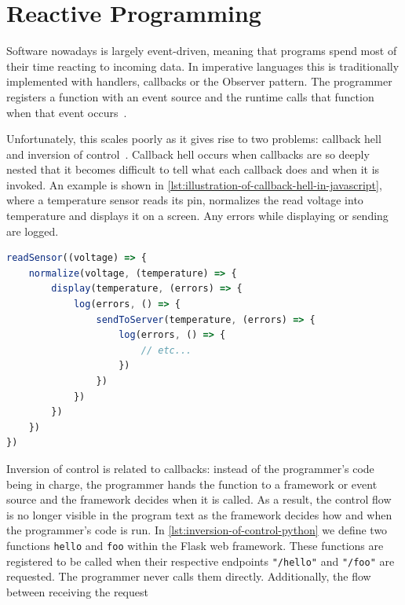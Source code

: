 \documentclass[a4paper]{book}
\begin{document}
\section{Reactive Programming}
\label{sec:reactive-programming}
Software nowadays is largely event-driven, meaning that programs spend most of
their time reacting to incoming data. In imperative languages this is
traditionally implemented with handlers, callbacks or the Observer pattern. The
programmer registers a function with an event source and the runtime calls that
function when that event occurs~\cite{surveyRP2024}.
\par
Unfortunately, this scales poorly as it gives rise to two problems: callback
hell and inversion of control~\cite{surveyRP2024}. Callback hell occurs when
callbacks are so deeply nested that it becomes difficult to tell what each
callback does and when it is invoked. An example is shown in
\cref{lst:illustration-of-callback-hell-in-javascript}, where a temperature
sensor reads its pin, normalizes the read voltage into temperature and displays
it on a screen. Any errors while displaying or sending are logged.
\begin{listing}[ht]
    \centering
	\begin{lstlisting}[language=JavaScript]
readSensor((voltage) => {
    normalize(voltage, (temperature) => {
        display(temperature, (errors) => {
            log(errors, () => {
                sendToServer(temperature, (errors) => {
                    log(errors, () => {
                        // etc...
                    })
                })
            })
        })
    })
})\end{lstlisting}
	\caption{Illustration of callback hell in JavaScript}
	\label{lst:illustration-of-callback-hell-in-javascript}
\end{listing}
\par
Inversion of control is related to callbacks: instead of the programmer's code
being in charge, the programmer hands the function to a framework or event
source and the framework decides when it is called. As a result, the control
flow is no longer visible in the program text as the framework decides how and
when the programmer's code is run. In \cref{lst:inversion-of-control-python} we
define two functions \texttt{hello} and \texttt{foo} within the Flask web
framework. These functions are registered to be called when their respective
endpoints \texttt{"/hello"} and \texttt{"/foo"} are requested. The programmer
never calls them directly. Additionally, the flow between receiving the request
\end{document}
